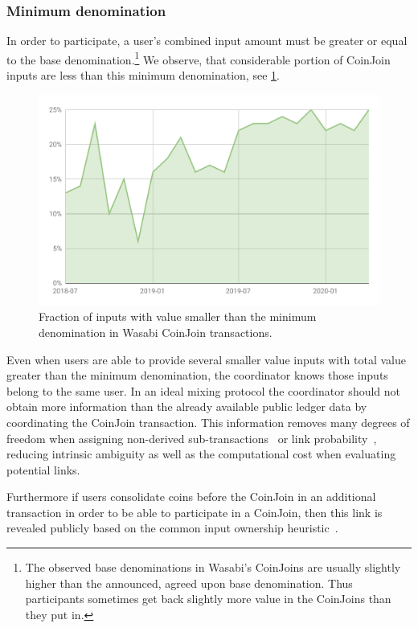\documentclass[a4paper]{article}
\begin{document}
\subsubsection{Minimum denomination}

In order to participate, a user's combined input amount must be greater or equal to the base denomination.\footnote{The observed base denominations in Wasabi's CoinJoins are usually slightly higher than the announced, agreed upon base denomination. Thus participants sometimes get back slightly more value in the CoinJoins than they put in.} We observe, that considerable portion of CoinJoin inputs are less than this minimum denomination, see \cref{fig:minimumdenomination}.

\begin{figure}[h!]
    \centering
    \includegraphics[scale=0.4]{Figures/SmallValueInputsWasabi.pdf}
    \caption{Fraction of inputs with value smaller than the minimum denomination in Wasabi CoinJoin transactions.}
    \label{fig:minimumdenomination}
\end{figure}

Even when users are able to provide several smaller value inputs with total value greater than the minimum denomination, the coordinator knows those inputs belong to the same user. In an ideal mixing protocol the coordinator should not obtain more information than the already available public ledger data by coordinating the CoinJoin transaction. This information removes many degrees of freedom when assigning non-derived sub-transactions~\cite{maurer2017anonymous} or link probability~\cite{laurentmt2015bitcoin}, reducing intrinsic ambiguity as well as the computational cost when evaluating potential links.

Furthermore if users consolidate coins before the CoinJoin in an additional transaction in order to be able to participate in a CoinJoin, then this link is revealed publicly based on the common input ownership heuristic~\cite{meiklejohn2013fistful}.
\end{document}
